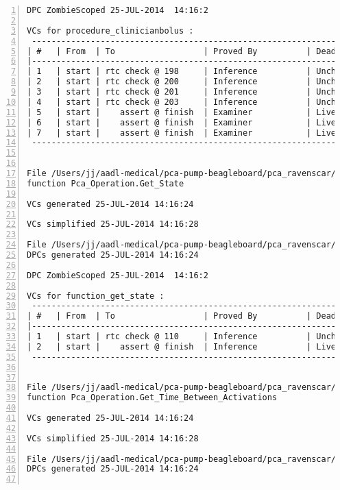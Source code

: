 \begin{lstlisting}[gobble=0, numbers=left, caption={POGS report for PCA Pump prototype}, label={listing:pca_ravenscar:pogs_full}]
DPC ZombieScoped 25-JUL-2014  14:16:2

VCs for procedure_clinicianbolus :
 -----------------------------------------------------------------------------
| #   | From  | To                  | Proved By          | Dead Path | Status |
|-----------------------------------------------------------------------------
| 1   | start | rtc check @ 198     | Inference          | Unchecked |   IU   |
| 2   | start | rtc check @ 200     | Inference          | Unchecked |   IU   |
| 3   | start | rtc check @ 201     | Inference          | Unchecked |   IU   |
| 4   | start | rtc check @ 203     | Inference          | Unchecked |   IU   |
| 5   | start |    assert @ finish  | Examiner           | Live      |   EL   |
| 6   | start |    assert @ finish  | Examiner           | Live      |   EL   |
| 7   | start |    assert @ finish  | Examiner           | Live      |   EL   |
 -----------------------------------------------------------------------------


File /Users/jj/aadl-medical/pca-pump-beagleboard/pca_ravenscar/pca_operation/get_state.vcg
function Pca_Operation.Get_State

VCs generated 25-JUL-2014 14:16:24

VCs simplified 25-JUL-2014 14:16:28

File /Users/jj/aadl-medical/pca-pump-beagleboard/pca_ravenscar/pca_operation/get_state.dpc
DPCs generated 25-JUL-2014 14:16:24

DPC ZombieScoped 25-JUL-2014  14:16:2

VCs for function_get_state :
 -----------------------------------------------------------------------------
| #   | From  | To                  | Proved By          | Dead Path | Status |
|-----------------------------------------------------------------------------
| 1   | start | rtc check @ 110     | Inference          | Unchecked |   IU   |
| 2   | start |    assert @ finish  | Inference          | Live      |   IL   |
 -----------------------------------------------------------------------------


File /Users/jj/aadl-medical/pca-pump-beagleboard/pca_ravenscar/pca_operation/get_time_between_activations.vcg
function Pca_Operation.Get_Time_Between_Activations

VCs generated 25-JUL-2014 14:16:24

VCs simplified 25-JUL-2014 14:16:28

File /Users/jj/aadl-medical/pca-pump-beagleboard/pca_ravenscar/pca_operation/get_time_between_activations.dpc
DPCs generated 25-JUL-2014 14:16:24


\end{lstlisting}
